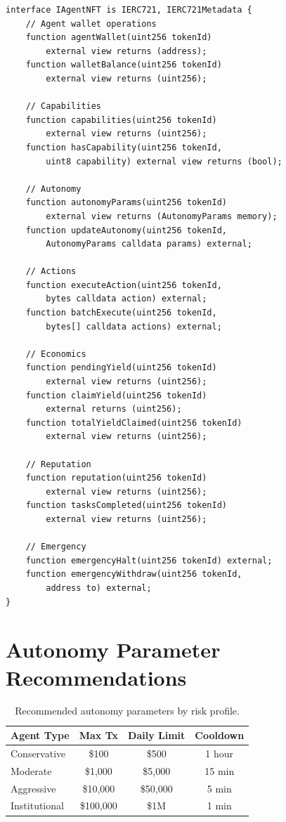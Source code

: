 \documentclass[11pt,letterpaper]{article}
\begin{document}
\begin{lstlisting}[language=Solidity,caption=Full IAgentNFT Interface]
interface IAgentNFT is IERC721, IERC721Metadata {
    // Agent wallet operations
    function agentWallet(uint256 tokenId)
        external view returns (address);
    function walletBalance(uint256 tokenId)
        external view returns (uint256);

    // Capabilities
    function capabilities(uint256 tokenId)
        external view returns (uint256);
    function hasCapability(uint256 tokenId,
        uint8 capability) external view returns (bool);

    // Autonomy
    function autonomyParams(uint256 tokenId)
        external view returns (AutonomyParams memory);
    function updateAutonomy(uint256 tokenId,
        AutonomyParams calldata params) external;

    // Actions
    function executeAction(uint256 tokenId,
        bytes calldata action) external;
    function batchExecute(uint256 tokenId,
        bytes[] calldata actions) external;

    // Economics
    function pendingYield(uint256 tokenId)
        external view returns (uint256);
    function claimYield(uint256 tokenId)
        external returns (uint256);
    function totalYieldClaimed(uint256 tokenId)
        external view returns (uint256);

    // Reputation
    function reputation(uint256 tokenId)
        external view returns (uint256);
    function tasksCompleted(uint256 tokenId)
        external view returns (uint256);

    // Emergency
    function emergencyHalt(uint256 tokenId) external;
    function emergencyWithdraw(uint256 tokenId,
        address to) external;
}
\end{lstlisting}

\section{Autonomy Parameter Recommendations}

\begin{table}[t]
\centering
\begin{tabular}{lccc}
\toprule
\textbf{Agent Type} & \textbf{Max Tx} & \textbf{Daily Limit} & \textbf{Cooldown} \\
\midrule
Conservative & \$100 & \$500 & 1 hour \\
Moderate & \$1,000 & \$5,000 & 15 min \\
Aggressive & \$10,000 & \$50,000 & 5 min \\
Institutional & \$100,000 & \$1M & 1 min \\
\bottomrule
\end{tabular}
\caption{Recommended autonomy parameters by risk profile.}
\label{tab:params}
\end{table}
\end{document}
